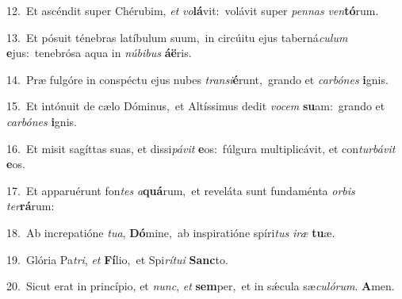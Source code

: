 {\numbfont\textcolor{\numbcolor}{12.}}~Et ascéndit super Chérubim, \textit{et} \textit{vo}\-\textbf{lá}vit:~\star volávit super \textit{pen}\-\textit{nas} \textit{ven}\-\textbf{tó}rum.\par
{\numbfont\textcolor{\numbcolor}{13.}}~Et pósuit ténebras latíbulum suum,~\dagger in circúitu ejus taberná\-\textit{cu}\-\textit{lum} \textbf{e}\-jus:~\star tenebrósa aqua in \textit{nú}\-\textit{bi}\textit{bus} \textbf{á}\-\textbf{ë}ris.\par
{\numbfont\textcolor{\numbcolor}{14.}}~Præ fulgóre in conspéctu ejus nubes \textit{trans}\-\textit{i}\textbf{é}runt,~\star grando et \textit{car}\-\textit{bó}\textit{nes} \textbf{i}\-gnis.\par
{\numbfont\textcolor{\numbcolor}{15.}}~Et intónuit de cælo Dóminus,~\dagger et Altíssimus dedit \textit{vo}\-\textit{cem} \textbf{su}\-am:~\star grando et \textit{car}\-\textit{bó}\textit{nes} \textbf{i}\-gnis.\par
{\numbfont\textcolor{\numbcolor}{16.}}~Et misit sagíttas suas, et dissi\-\textit{pá}\-\textit{vit} \textbf{e}\-os:~\star fúlgura multiplicávit, et con\-\textit{tur}\-\textit{bá}\textit{vit} \textbf{e}\-os.\par
{\numbfont\textcolor{\numbcolor}{17.}}~Et apparuérunt fon\textit{tes} \textit{a}\-\textbf{quá}rum,~\star et reveláta sunt fundaménta \textit{or}\-\textit{bis} \textit{ter}\-\textbf{rá}rum:\par
{\numbfont\textcolor{\numbcolor}{18.}}~Ab increpatióne \textit{tu}\-\textit{a}, \textbf{Dó}\-mine,~\star ab inspiratióne spíri\textit{tus} \textit{i}\-\textit{ræ} \textbf{tu}\-æ.\par
{\numbfont\textcolor{\numbcolor}{19.}}~Glória Pa\-\textit{tri}\-, \textit{et} \textbf{Fí}\-lio,~\star et Spi\-\textit{rí}\-\textit{tu}\textit{i} \textbf{Sanc}\-to.\par
{\numbfont\textcolor{\numbcolor}{20.}}~Sicut erat in princípio, et \textit{nunc}\-, \textit{et} \textbf{sem}\-per,~\star et in sǽcula sæ\-\textit{cu}\-\textit{ló}\textit{rum}. \textbf{A}\-men.\par
